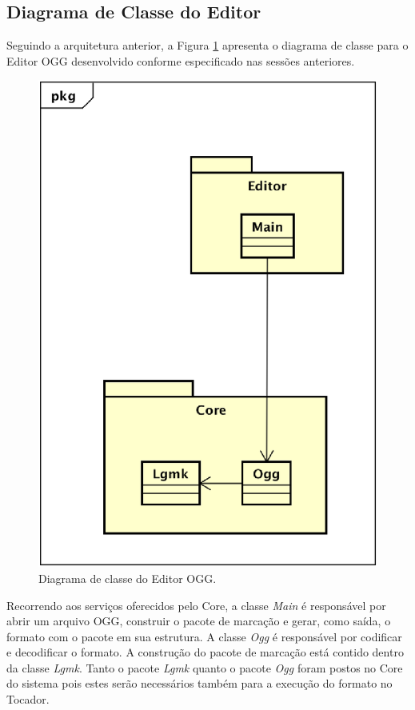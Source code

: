 \subsection{Diagrama de Classe do Editor}

Seguindo a arquitetura anterior, a Figura \ref{editorogg} apresenta o diagrama de classe para o Editor OGG desenvolvido conforme especificado nas sessões anteriores.

\begin{figure}[ht]
	\centering
		\includegraphics[keepaspectratio=true,scale=0.5]{figuras/editorogg.eps}
	\caption{Diagrama de classe do Editor OGG.}
	\label{editorogg}
\end{figure}

Recorrendo aos serviços oferecidos pelo Core, a classe \textit{Main} é responsável por abrir um arquivo OGG, construir o pacote de marcação e gerar, como saída, o formato com o pacote em sua estrutura. A classe \textit{Ogg} é responsável por codificar e decodificar o formato. A construção do pacote de marcação está contido dentro da classe \textit{Lgmk}. Tanto o pacote \textit{Lgmk} quanto o pacote \textit{Ogg} foram postos no Core do sistema pois estes serão necessários também para a execução do formato no Tocador.

